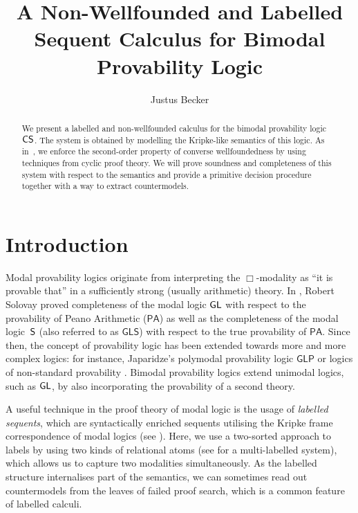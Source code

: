 \documentclass[runningheads,orivec]{llncs}
\newcommand{\CS}{\textnormal{\textsf{CS}}}
\newcommand{\GL}{\textnormal{\textsf{GL}}}
\renewcommand{\S}{\textnormal{\textsf{S}}}
\newcommand{\GLP}{\mathsf{GLP}}
\newcommand{\PA}{\mathsf{PA}}
\begin{document}
 
%
\title{A Non-Wellfounded and Labelled Sequent Calculus for Bimodal Provability Logic}
%
%
\author{Justus Becker}
%
%
%
\maketitle              %
%
\begin{abstract}
We present a labelled and non-wellfounded calculus for the bimodal provability logic $\CS$.
The system is obtained by modelling the Kripke-like semantics of this logic. As in~\cite{Das_et_al24}, we enforce the second-order property of converse wellfoundedness by using techniques from cyclic proof theory. 
We will prove soundness and completeness of this system with respect to the semantics and provide a primitive decision procedure together with a way to extract countermodels. 

\end{abstract}
%
%
\section{Introduction}
Modal provability logics originate from interpreting the $\Box$-modality as ``it is provable that'' in a sufficiently strong (usually arithmetic) theory. 
In \cite{Solovay76}, Robert Solovay proved completeness of the modal logic $\GL$ with respect to the provability of Peano Arithmetic ($\PA$) as well as the completeness of the modal logic~$\S$ (also referred to as $\mathsf{GLS}$) with respect to the true provability of $\PA$.
Since then, the concept of provability logic has been extended towards more and more complex logics: for instance, Japaridze's polymodal provability logic $\GLP$ \cite{Japaridze86} or logics of non-standard provability \cite{Feferman60,Henk16,Shavrukov94,Visser89}.
Bimodal provability logics extend unimodal logics, such as $\GL$, by also incorporating the provability of a second theory. 

A useful technique in the proof theory of modal logic is the usage of \emph{labelled sequents}, which are syntactically enriched sequents utilising the Kripke frame correspondence of modal logics (see \cite{Negri05,Simpson1994,Vigano2000}). 
Here, we use a two-sorted approach to labels by using two kinds of relational atoms (see \cite{GargGenoveseNegri_2012} for a multi-labelled system), which  allows us to capture two modalities simultaneously. As the labelled structure internalises part of the semantics, we can sometimes read out countermodels from the leaves of failed proof search, which is a common feature of labelled calculi.
\end{document}
